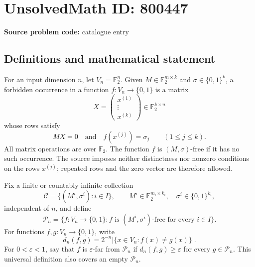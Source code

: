 \documentclass[11pt]{article}
\begin{document}
\section*{UnsolvedMath ID: 800447}
\textbf{Source problem code:} catalogue entry
\subsection{Definitions and mathematical statement}
For an input dimension \(n\), let \(V_n=\mathbb F_2^n\). Given \(M\in\mathbb F_2^{m\times k}\) and \(\sigma\in\{0,1\}^k\), a forbidden occurrence in a function \(f\colon V_n\to\{0,1\}\) is a matrix
\[
X=\begin{pmatrix}x^{(1)}\\ \vdots\\ x^{(k)}\end{pmatrix}\in\mathbb F_2^{k\times n}
\]
whose rows satisfy
\[
MX=0\quad\text{and}\quad f(x^{(j)})=\sigma_j\qquad(1\le j\le k).
\]
All matrix operations are over \(\mathbb F_2\). The function \(f\) is \((M,\sigma)\)-free if it has no such occurrence. The source imposes neither distinctness nor nonzero conditions on the rows \(x^{(j)}\); repeated rows and the zero vector are therefore allowed.

Fix a finite or countably infinite collection
\[
\mathcal C=\{(M^i,\sigma^i):i\in I\},\qquad M^i\in\mathbb F_2^{m_i\times k_i},\quad \sigma^i\in\{0,1\}^{k_i},
\]
independent of \(n\), and define
\[
\mathcal P_n=\{f\colon V_n\to\{0,1\}:f\text{ is }(M^i,\sigma^i)\text{-free for every }i\in I\}.
\]
For functions \(f,g\colon V_n\to\{0,1\}\), write
\[
d_n(f,g)=2^{-n}\bigl|\{x\in V_n:f(x)\ne g(x)\}\bigr|.
\]
For \(0<\varepsilon<1\), say that \(f\) is \(\varepsilon\)-far from \(\mathcal P_n\) if \(d_n(f,g)\ge\varepsilon\) for every \(g\in\mathcal P_n\). This universal definition also covers an empty \(\mathcal P_n\).
\end{document}
